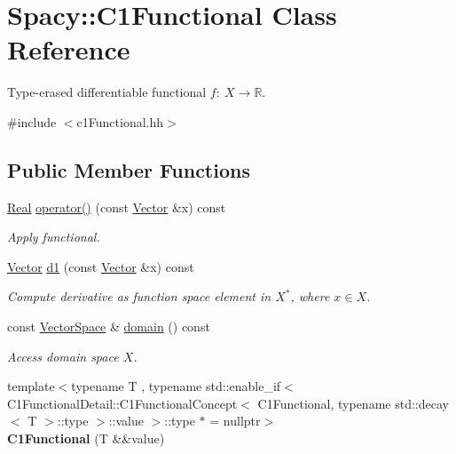 \hypertarget{classSpacy_1_1C1Functional}{\section{\-Spacy\-:\-:\-C1\-Functional \-Class \-Reference}
\label{classSpacy_1_1C1Functional}
}


\-Type-\/erased differentiable functional $f:\ X \to \mathbb{R} $.  




{\ttfamily \#include $<$c1\-Functional.\-hh$>$}

\subsection*{\-Public \-Member \-Functions}
\begin{DoxyCompactItemize}
\item 
\hypertarget{classSpacy_1_1C1Functional_a621b710f0c8c583d074f4bf4da3cbb09}{\hyperlink{classSpacy_1_1Real}{\-Real} \hyperlink{classSpacy_1_1C1Functional_a621b710f0c8c583d074f4bf4da3cbb09}{operator()} (const \hyperlink{classSpacy_1_1Vector}{\-Vector} \&x) const }\label{classSpacy_1_1C1Functional_a621b710f0c8c583d074f4bf4da3cbb09}

\begin{DoxyCompactList}\small\item\em \-Apply functional. \end{DoxyCompactList}\item 
\hypertarget{classSpacy_1_1C1Functional_a5953291c58bf20e87ab2bfe26231fe49}{\hyperlink{classSpacy_1_1Vector}{\-Vector} \hyperlink{classSpacy_1_1C1Functional_a5953291c58bf20e87ab2bfe26231fe49}{d1} (const \hyperlink{classSpacy_1_1Vector}{\-Vector} \&x) const }\label{classSpacy_1_1C1Functional_a5953291c58bf20e87ab2bfe26231fe49}

\begin{DoxyCompactList}\small\item\em \-Compute derivative as function space element in $X^*$, where $x\in X$. \end{DoxyCompactList}\item 
\hypertarget{classSpacy_1_1C1Functional_a3ec8df7e7998b557445c907cbd8e80b8}{const \hyperlink{classSpacy_1_1VectorSpace}{\-Vector\-Space} \& \hyperlink{classSpacy_1_1C1Functional_a3ec8df7e7998b557445c907cbd8e80b8}{domain} () const }\label{classSpacy_1_1C1Functional_a3ec8df7e7998b557445c907cbd8e80b8}

\begin{DoxyCompactList}\small\item\em \-Access domain space $X$. \end{DoxyCompactList}\item 
\hypertarget{classSpacy_1_1C1Functional_ada8999210df700c93ee7d7c35bdabebc}{{\footnotesize template$<$typename T , typename std\-::enable\-\_\-if$<$ C1\-Functional\-Detail\-::\-C1\-Functional\-Concept$<$ C1\-Functional, typename std\-::decay$<$ T $>$\-::type $>$\-::value $>$\-::type $\ast$  = nullptr$>$ }\\{\bfseries \-C1\-Functional} (\-T \&\&value)}\label{classSpacy_1_1C1Functional_ada8999210df700c93ee7d7c35bdabebc}


\end{DoxyCompactItemize}
